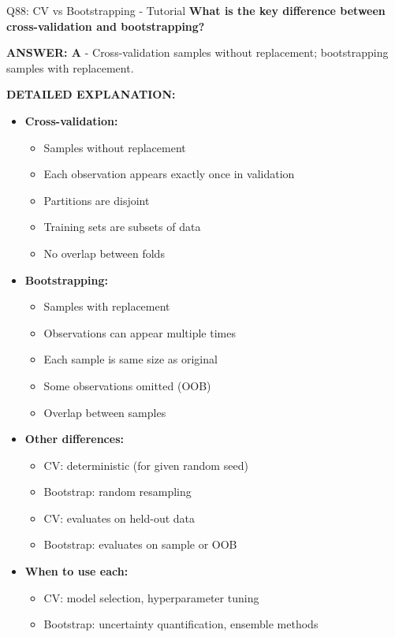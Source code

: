 \documentclass[8pt]{beamer}
\begin{document}
	\begin{frame}{Q88: CV vs Bootstrapping - Tutorial}
		\fontsize{6.5}{7.5}\selectfont
		\textbf{What is the key difference between cross-validation and bootstrapping?}
		
		\vspace{0.05cm}
		\textcolor{myblue}{\textbf{ANSWER: A}} - Cross-validation samples without replacement; bootstrapping samples with replacement.
		
		\vspace{0.05cm}
		\textbf{DETAILED EXPLANATION:}
		\begin{itemize}
			\item \textbf{Cross-validation:}
			\begin{itemize}
				\item Samples without replacement
				\item Each observation appears exactly once in validation
				\item Partitions are disjoint
				\item Training sets are subsets of data
				\item No overlap between folds
			\end{itemize}
			\item \textbf{Bootstrapping:}
			\begin{itemize}
				\item Samples with replacement
				\item Observations can appear multiple times
				\item Each sample is same size as original
				\item Some observations omitted (OOB)
				\item Overlap between samples
			\end{itemize}
			\item \textbf{Other differences:}
			\begin{itemize}
				\item CV: deterministic (for given random seed)
				\item Bootstrap: random resampling
				\item CV: evaluates on held-out data
				\item Bootstrap: evaluates on sample or OOB
			\end{itemize}
			\item \textbf{When to use each:}
			\begin{itemize}
				\item CV: model selection, hyperparameter tuning
				\item Bootstrap: uncertainty quantification, ensemble methods
			\end{itemize}
		\end{itemize}
		

\end{frame}
\end{document}
